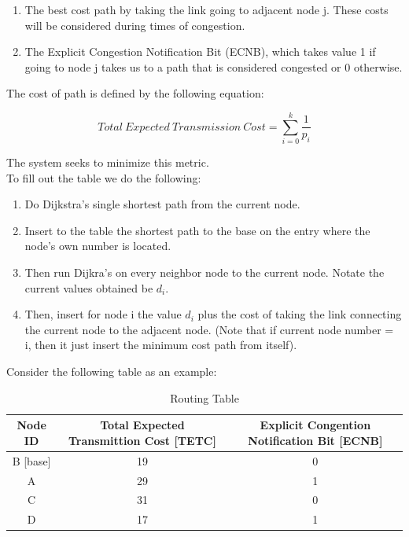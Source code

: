 \documentclass[letterpaper]{article}
\begin{document}
\begin{enumerate}
  \item The best cost path by taking the link going to adjacent node j. These costs will be considered during times of congestion.
  \item The Explicit Congestion Notification Bit (ECNB), which takes value 1 if going to node j takes us to a path that is considered congested or 0 otherwise.
\end{enumerate}

\noindent The cost of path is defined by the following equation:

$$  Total \ Expected \ Transmission \ Cost = \sum_{i=0}^{k}\frac{1}{p_{i}}$$

\noindent The system seeks to minimize this metric.
\\

\noindent To fill out the table we do the following:

\begin{enumerate}
  \item Do Dijkstra's single shortest path from the current node.  
  \item Insert to the table the shortest path to the base on the entry where the node's own number is located.
  \item Then run Dijkra's on every neighbor node to the current node. Notate the current values obtained be $d_{i}$.
  \item Then, insert for node i the value $d_{i}$ plus the cost of taking the link connecting the current node to the adjacent node. (Note that if current node number = i, then it just insert the minimum cost path from itself).
\end{enumerate}

\noindent Consider the following table as an example:

\begin{table}[ht]
\caption{Routing Table} %
\centering %
\begin{tabular}{c c c} %
\hline
\hline %
Node ID & Total Expected Transmittion Cost [TETC] & Explicit Congention Notification Bit [ECNB]  \\[0.5ex] %
\hline %
B [base] & 19 & 0\\
A & 29 & 1\\
C & 31 & 0 \\
D & 17 & 1\\ [1ex]
\hline
\end{tabular}
\label{table:nonlin}
\end{table}
\end{document}
